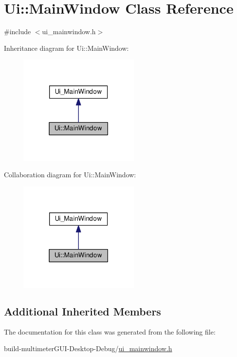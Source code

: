 \hypertarget{class_ui_1_1_main_window}{\section{Ui\-:\-:Main\-Window Class Reference}
\label{class_ui_1_1_main_window}
}


{\ttfamily \#include $<$ui\-\_\-mainwindow.\-h$>$}



Inheritance diagram for Ui\-:\-:Main\-Window\-:\nopagebreak
\begin{figure}[H]
\begin{center}
\leavevmode
\includegraphics[width=170pt]{class_ui_1_1_main_window__inherit__graph}
\end{center}
\end{figure}


Collaboration diagram for Ui\-:\-:Main\-Window\-:\nopagebreak
\begin{figure}[H]
\begin{center}
\leavevmode
\includegraphics[width=170pt]{class_ui_1_1_main_window__coll__graph}
\end{center}
\end{figure}
\subsection*{Additional Inherited Members}


The documentation for this class was generated from the following file\-:\begin{DoxyCompactItemize}
\item 
build-\/multimeter\-G\-U\-I-\/\-Desktop-\/\-Debug/\hyperlink{ui__mainwindow_8h}{ui\-\_\-mainwindow.\-h}\end{DoxyCompactItemize}
